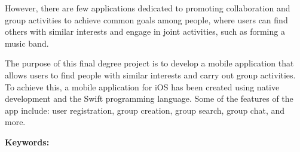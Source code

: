 \documentclass{book}
\begin{document}
However, there are few applications dedicated to promoting collaboration 
and group activities to achieve common goals among people, where users can 
find others with similar interests and engage in joint activities, such as 
forming a music band.

The purpose of this final degree project is to develop a mobile application 
that allows users to find people with similar interests and carry out group 
activities. To achieve this, a mobile application for iOS has been created 
using native development and the Swift programming language. Some of the 
features of the app include: user registration, group creation, group search, 
group chat, and more.

\textbf{\large Keywords: }
\endgroup
\begin{comment}
\begin{table}[ht]
    \centering
    \begin{tabular}{|m{3cm}|m{10cm}|}
        \hline
        \rowcolor{blue!20} Primary Actors        & Usuario                   \\
        \hline
        Level                                    & N/A                       \\
        \hline
        \rowcolor{blue!20} Complexity            & Low                       \\
        \hline
        Use Case Status                          & N/A                       \\
        \hline
        \rowcolor{blue!20} Implementation Status & N/A                       \\
        \hline
        Preconditions                            & N/A                       \\
        \hline
        \rowcolor{blue!20} Post-conditions       & N/A                       \\
        \hline
        Author                                   & Matvey Dergunov Bushmanov \\
        \hline
        \rowcolor{blue!20} Assumptions           & N/A                       \\
        \hline
    \end{tabular}
    \caption{Abandonar grupo Requirements Spec}
\end{table}
\end{comment}
\tableofcontents
\end{document}
